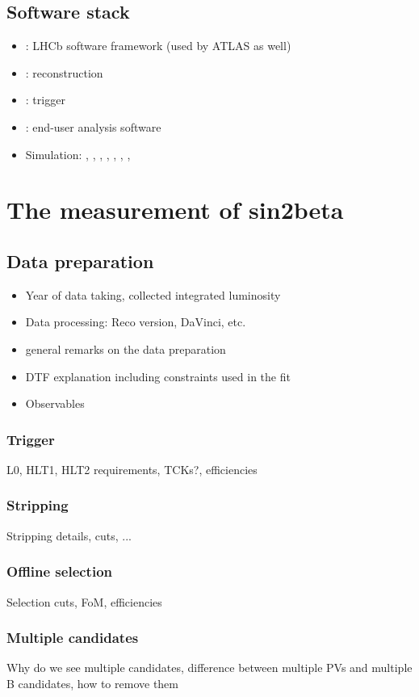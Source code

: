 \section{Software stack}
\begin{itemize}
  \item \Gaudi: LHCb software framework (used by ATLAS as well)
  \item \Brunel: reconstruction
  \item \Brunel: trigger
  \item \DaVinci: end-user analysis software
  \item Simulation: \Gauss, \Boole, \Pythia, \EvtGen, \Photos, \Herwigpp, \Sherpa, \GeantFour
\end{itemize}

\chapter{The measurement of sin2beta}
\section{Data preparation}
\begin{itemize}
  \item Year of data taking, collected integrated luminosity
  \item Data processing: Reco version, DaVinci, etc.
  \item general remarks on the data preparation
  \item DTF explanation including constraints used in the fit
  \item Observables
\end{itemize}

\subsection{Trigger}
L0, HLT1, HLT2 requirements, TCKs?, efficiencies

\subsection{Stripping}
Stripping details, cuts, ...

\subsection{Offline selection}
Selection cuts, FoM, efficiencies

\subsection{Multiple candidates}
Why do we see multiple candidates, difference between multiple PVs and multiple B candidates, how to remove them

